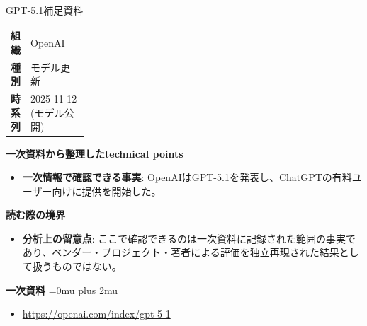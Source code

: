 \begin{technicalnote}{GPT-5.1}{補足資料}
\begingroup
\begin{tabularx}{\linewidth}{@{}>{\bfseries}p{0.22\linewidth}X@{}}
組織 & OpenAI \\
種別 & モデル更新 \\
時系列 & 2025-11-12 (モデル公開) \\
\end{tabularx}
\smallskip
{\bfseries 一次資料から整理したtechnical points}
\begin{itemize}[leftmargin=1.5em,itemsep=0.35em]
\item \textbf{一次情報で確認できる事実}: OpenAIはGPT-5.1を発表し、ChatGPTの有料ユーザー向けに提供を開始した。
\end{itemize}
\begin{minipage}{\linewidth}
{\bfseries 読む際の境界}
\begin{itemize}[leftmargin=1.5em,itemsep=0.35em]
\item \textbf{分析上の留意点}: ここで確認できるのは一次資料に記録された範囲の事実であり、ベンダー・プロジェクト・著者による評価を独立再現された結果として扱うものではない。
\end{itemize}
\begin{samepage}
{\bfseries 一次資料}
\begingroup\sloppy
\Urlmuskip=0mu plus 2mu\relax
\begin{itemize}[leftmargin=1.5em,itemsep=0.25em]
\item {\scriptsize\url{https://openai.com/index/gpt-5-1}}
\end{itemize}
\endgroup
\end{samepage}
\end{minipage}
\endgroup
\end{technicalnote}
\medskip

